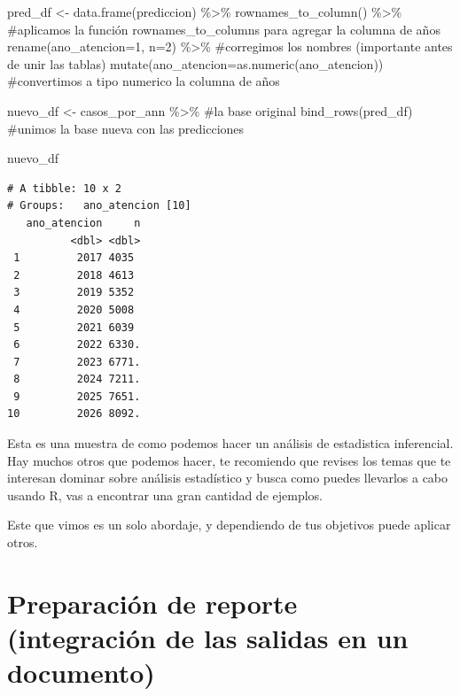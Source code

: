 \documentclass[
  letterpaper,
  DIV=11,
  numbers=noendperiod]{scrreprt}
\newenvironment{Shaded}{\begin{snugshade}}{\end{snugshade}}
\newcommand{\AttributeTok}[1]{\textcolor[rgb]{0.40,0.45,0.13}{#1}}
\newcommand{\CommentTok}[1]{\textcolor[rgb]{0.37,0.37,0.37}{#1}}
\newcommand{\DecValTok}[1]{\textcolor[rgb]{0.68,0.00,0.00}{#1}}
\newcommand{\FunctionTok}[1]{\textcolor[rgb]{0.28,0.35,0.67}{#1}}
\newcommand{\NormalTok}[1]{\textcolor[rgb]{0.00,0.23,0.31}{#1}}
\newcommand{\OtherTok}[1]{\textcolor[rgb]{0.00,0.23,0.31}{#1}}
\newcommand{\SpecialCharTok}[1]{\textcolor[rgb]{0.37,0.37,0.37}{#1}}
\begin{document}
\begin{Shaded}
\begin{Highlighting}[]
\NormalTok{pred\_df }\OtherTok{\textless{}{-}} \FunctionTok{data.frame}\NormalTok{(prediccion) }\SpecialCharTok{\%\textgreater{}\%} 
  \FunctionTok{rownames\_to\_column}\NormalTok{() }\SpecialCharTok{\%\textgreater{}\%}  \CommentTok{\#aplicamos la función rownames\_to\_columns para agregar la columna de años}
  \FunctionTok{rename}\NormalTok{(}\AttributeTok{ano\_atencion=}\DecValTok{1}\NormalTok{, }\AttributeTok{n=}\DecValTok{2}\NormalTok{) }\SpecialCharTok{\%\textgreater{}\%}  \CommentTok{\#corregimos los nombres (importante antes de unir las tablas)}
  \FunctionTok{mutate}\NormalTok{(}\AttributeTok{ano\_atencion=}\FunctionTok{as.numeric}\NormalTok{(ano\_atencion)) }\CommentTok{\#convertimos a tipo numerico la columna de años}

\NormalTok{nuevo\_df }\OtherTok{\textless{}{-}}\NormalTok{ casos\_por\_ann }\SpecialCharTok{\%\textgreater{}\%}  \CommentTok{\#la base original}
  \FunctionTok{bind\_rows}\NormalTok{(pred\_df) }\CommentTok{\#unimos la base nueva con las predicciones}

\NormalTok{nuevo\_df}
\end{Highlighting}
\end{Shaded}

\begin{verbatim}
# A tibble: 10 x 2
# Groups:   ano_atencion [10]
   ano_atencion     n
          <dbl> <dbl>
 1         2017 4035 
 2         2018 4613 
 3         2019 5352 
 4         2020 5008 
 5         2021 6039 
 6         2022 6330.
 7         2023 6771.
 8         2024 7211.
 9         2025 7651.
10         2026 8092.
\end{verbatim}

Esta es una muestra de como podemos hacer un análisis de estadistica
inferencial. Hay muchos otros que podemos hacer, te recomiendo que
revises los temas que te interesan dominar sobre análisis estadístico y
busca como puedes llevarlos a cabo usando R, vas a encontrar una gran
cantidad de ejemplos.

Este que vimos es un solo abordaje, y dependiendo de tus objetivos puede
aplicar otros.


\chapter{Preparación de reporte (integración de las salidas en un
documento)}\label{preparaciuxf3n-de-reporte-integraciuxf3n-de-las-salidas-en-un-documento}
\end{document}
